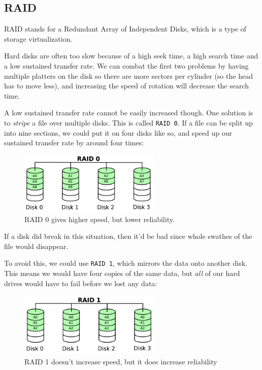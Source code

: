\subsection{RAID}

RAID stands for a Redundant Array of Independent Disks, which is a type of
storage virtualization.

Hard disks are often too slow because of a high seek time, a high search time
and a low sustained transfer rate. We can combat the first two problems by
having multiple platters on the disk so there are more sectors per cylinder (so
the head has to move less), and increasing the speed of rotation will decrease
the search time.

A low sustained transfer rate cannot be easily increased though. One solution is
to \textit{stripe} a file over multiple disks. This is called \texttt{RAID 0}.
If a file can be split up into nine sections, we could put it on four disks like
so, and speed up our sustained transfer rate by around four times:

\begin{figure}[H]
  \centering
  \includegraphics[width=0.6\textwidth]{images/raid0}
  \caption{RAID 0 gives higher speed, but lower reliability.}
  \label{raid0}
\end{figure}  

If a disk did break in this situation, then it'd be bad since whole swathes of
the file would disappear.

To avoid this, we could use \texttt{RAID 1}, which mirrors the data onto
another disk. This means we would have four copies of the same data, but
\textit{all} of our hard drives would have to fail before we lost any data:

\begin{figure}[H]
  \centering
  \includegraphics[width=0.6\textwidth]{images/raid1}
  \caption{RAID 1 doesn't increase speed, but it does increase reliability}
  \label{raid1}
\end{figure}

